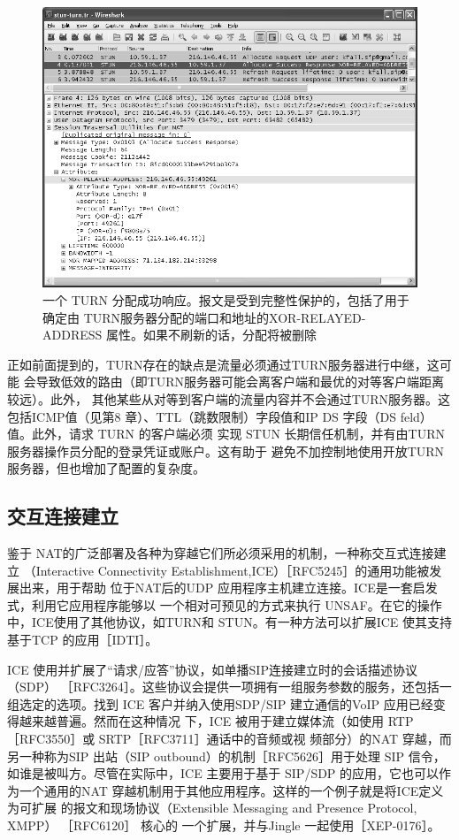 \begin{figure}[H]
    \centering
	\includegraphics[scale=0.5]{imgs/7/7-15.png}
	\caption{一个 TURN 分配成功响应。报文是受到完整性保护的，包括了用于确定由 TURN服务器分配的端口和地址的XOR-RELAYED-ADDRESS 属性。如果不刷新的话，分配将被删除}
\end{figure}

正如前面提到的，TURN存在的缺点是流量必须通过TURN服务器进行中继，这可能
会导致低效的路由（即TURN服务器可能会离客户端和最优的对等客户端距离较远）。此外，
其他某些从对等到客户端的流量内容并不会通过TURN服务器。这包括ICMP值（见第8
章）、TTL（跳数限制）字段值和IP DS 字段（DS feld）值。此外，请求 TURN 的客户端必须
实现 STUN 长期信任机制，并有由TURN服务器操作员分配的登录凭证或账户。这有助于
避免不加控制地使用开放TURN 服务器，但也增加了配置的复杂度。

\subsection{交互连接建立}

鉴于 NAT的广泛部署及各种为穿越它们所必须采用的机制，一种称交互式连接建立
（Interactive Connectivity Establishment,ICE）［RFC5245］的通用功能被发展出来，用于帮助
位于NAT后的UDP 应用程序主机建立连接。ICE是一套启发式，利用它应用程序能够以
一个相对可预见的方式来执行 UNSAF。在它的操作中，ICE使用了其他协议，如TURN和
STUN。有一种方法可以扩展ICE 使其支持基于TCP 的应用［IDTI］。

ICE 使用并扩展了“请求/应答”协议，如单播SIP连接建立时的会话描述协议（SDP）
［RFC3264］。这些协议会提供一项拥有一组服务参数的服务，还包括一组选定的选项。找到
ICE 客户并纳入使用SDP/SIP 建立通信的VoIP 应用已经变得越来越普遍。然而在这种情况
下，ICE 被用于建立媒体流（如使用 RTP［RFC3550］或 SRTP［RFC3711］通话中的音频或视
频部分）的NAT 穿越，而另一种称为SIP 出站（SIP outbound）的机制［RFC5626］用于处理
SIP 信令，如谁是被叫方。尽管在实际中，ICE 主要用于基于 SIP/SDP 的应用，它也可以作
为一个通用的NAT 穿越机制用于其他应用程序。这样的一个例子就是将ICE定义为可扩展
的报文和现场协议（Extensible Messaging and Presence Protocol, XMPP） ［RFC6120］ 核心的
一个扩展，并与Jingle 一起使用［XEP-0176］。

